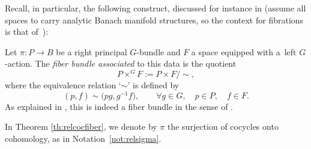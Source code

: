 \documentclass[10pt,a4paper]{amsart}
\numberwithin{equation}{section}
\begin{document}
Recall, in particular, the following construct, discussed for instance in \cite[Section~6.5]{bourb-vars-17} (assume all spaces to carry analytic Banach manifold structures, so the context for fibrations is that of~\cite[Section~6.1.1]{bourb-vars-17}):

\begin{Definition}\label{def:assocbdle}
 Let $\pi\colon P\to B$ be a right principal $G$-bundle and $F$ a space equipped with a~left $G$-action. The {\it fiber bundle associated} to this data is the quotient
 \begin{equation*}
 P\times^G F:=P\times F/{\sim},
 \end{equation*}
 where the equivalence relation `$\sim$' is defined by
 \begin{equation*}
 (p,f)\sim \big(pg,g^{-1}f\big),\qquad \forall g\in G,\quad p\in P,\quad f\in F.
 \end{equation*}
 As explained in \cite[Section~6.5.2]{bourb-vars-17}, this is indeed a fiber bundle in the sense of \cite[Section~6.1.1]{bourb-vars-17}.
\end{Definition}

In Theorem \ref{th:relcocfiber}, we denote by $\pi$ the surjection of cocycles onto cohomology, as in Notation~\ref{not:relsigma}.
\end{document}
